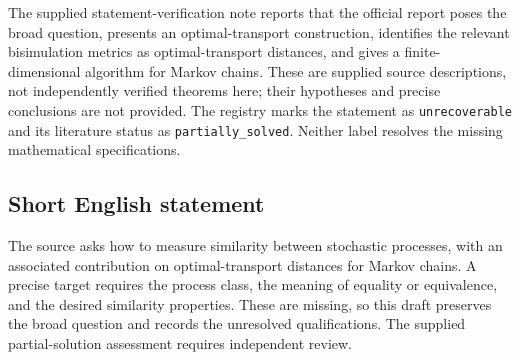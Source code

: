 \documentclass[11pt]{article}
\begin{document}
The supplied statement-verification note reports that the official report poses the broad question, presents an optimal-transport construction, identifies the relevant bisimulation metrics as optimal-transport distances, and gives a finite-dimensional algorithm for Markov chains. These are supplied source descriptions, not independently verified theorems here; their hypotheses and precise conclusions are not provided. The registry marks the statement as \texttt{unrecoverable} and its literature status as \texttt{partially\_solved}. Neither label resolves the missing mathematical specifications.
\subsection{Short English statement}
The source asks how to measure similarity between stochastic processes, with an associated contribution on optimal-transport distances for Markov chains. A precise target requires the process class, the meaning of equality or equivalence, and the desired similarity properties. These are missing, so this draft preserves the broad question and records the unresolved qualifications. The supplied partial-solution assessment requires independent review.
\end{document}
